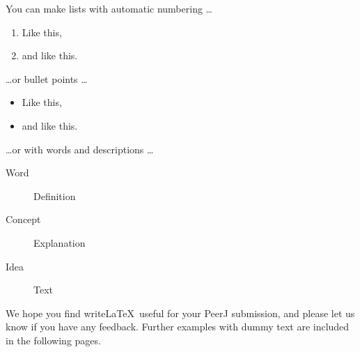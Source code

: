 \documentclass[fleqn,10pt]{wlpeerj}
\begin{document}
You can make lists with automatic numbering \dots

\begin{enumerate}[noitemsep] 
	\item Like this,
	\item and like this.
\end{enumerate}
\dots or bullet points \dots
\begin{itemize}[noitemsep] 
	\item Like this,
	\item and like this.
\end{itemize}
\dots or with words and descriptions \dots
\begin{description}
	\item[Word] Definition
	\item[Concept] Explanation
	\item[Idea] Text
\end{description}

We hope you find write\LaTeX\ useful for your PeerJ submission, and please let us know if you have any feedback. Further examples with dummy text are included in the following pages.



\end{document}
